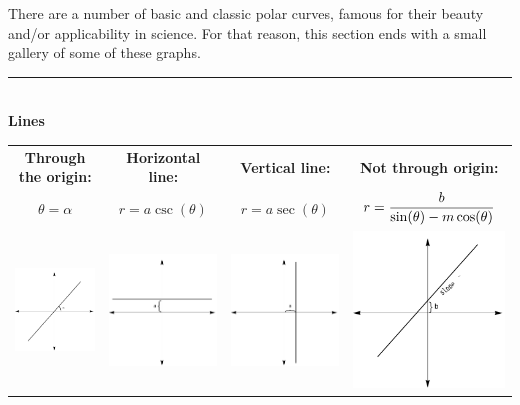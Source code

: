 \begin{example}
\end{example}

There are a number of basic and classic polar curves, famous for their beauty and/or applicability in science. For that reason, this section ends with a small gallery of some of these graphs.

\newlength{\gallerywidth}
\setlength{\gallerywidth}{(0pt+\marginparwidth+\textwidth)/4}
\rule{25pt+\marginparwidth+\textwidth}{1pt}\\


\textbf{\large Lines}\\


\begin{tabular}{cccc}
\textbf{Through the origin:} & \textbf{Horizontal line:} & \textbf{Vertical line:} & \textbf{Not through origin:} \\[5pt]
$\theta = \alpha$ & $r=a\csc(\theta)$ & $r=a\sec(\theta)$ & $\displaystyle r=\frac{b}{\sin(\theta)-m\cos(\theta)}$ \\[10pt]
\includegraphics[width=.22\textwidth]{fig_parametric_8a} & \includegraphics[width=.22\textwidth]{fig_parametric_8b} & \includegraphics[width=.22\textwidth]{fig_parametric_8c} & \includegraphics[width=.22\textwidth]{fig_parametric_8d}
\end{tabular}

